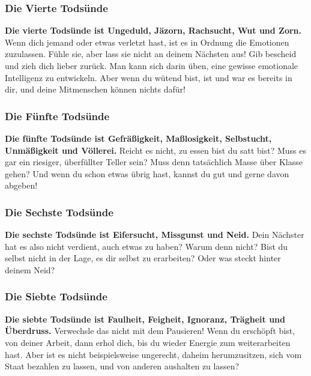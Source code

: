 \documentclass[10pt,a5paper]{article}
\begin{document}
	\subsubsection{Die Vierte Tods\"unde}
		\textbf{Die vierte Tods\"unde ist Ungeduld,
		J\"azorn,
		Rachsucht,
		Wut und Zorn.}
		Wenn dich jemand oder etwas verletzt hast,
		ist es in Ordnung die Emotionen zuzulassen.
		F\"uhle sie,
		aber lass sie nicht an deinem N\"achsten aus!
		Gib bescheid und zieh dich lieber zur\"uck.
		Man kann sich darin \"uben,
		eine gewisse emotionale Intelligenz zu entwickeln.
		Aber wenn du w\"utend bist,
		ist und war es bereits in dir,
		und deine Mitmenschen k\"onnen nichts daf\"ur!

	\subsubsection{Die F\"unfte Tods\"unde}
		\textbf{Die f\"unfte Tods\"unde ist Gefr\"a{\ss}igkeit,
		Ma{\ss}losigkeit,
		Selbstucht,
		Unm\"a{\ss}igkeit und V\"ollerei.}
		Reicht es nicht,
		zu essen bist du satt bist?
		Muss es gar ein riesiger,
		\"uberf\"ullter Teller sein?
		Muss denn tats\"achlich Masse \"uber Klasse gehen?
		Und wenn du schon etwas \"ubrig hast,
		kannst du gut und gerne davon abgeben!
	
	\subsubsection{Die Sechste Tods\"unde}
		\textbf{Die sechste Tods\"unde ist Eifersucht,
		Missgunst und Neid.}
		Dein N\"achster hat es also nicht verdient,
		auch etwas zu haben?
		Warum denn nicht?
		Bist du selbst nicht in der Lage,
		es dir selbst zu erarbeiten?
		Oder was steckt hinter deinem Neid?

	\subsubsection{Die Siebte Tods\"unde}
		\textbf{Die siebte Tods\"unde ist Faulheit,
		Feigheit,
		Ignoranz,
		Tr\"agheit und \"Uberdruss.}
		Verwechsle das nicht mit dem Pausieren!
		Wenn du ersch\"opft bist,
		von deiner Arbeit,
		dann erhol dich,
		bis du wieder Energie zum weiterarbeiten hast.
		Aber ist es nicht beispielsweise ungerecht,
		daheim herumzusitzen,
		sich vom Staat bezahlen zu lassen,
		und von anderen aushalten zu lassen?
\end{document}
